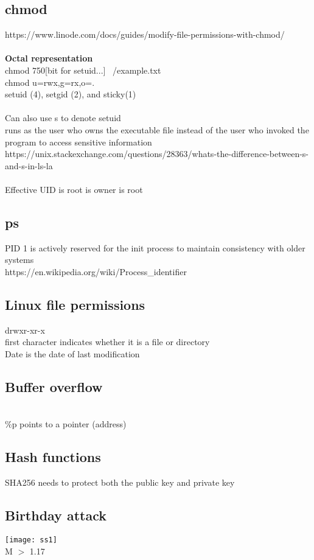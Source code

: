 \documentclass[11pt]{article}
\begin{document}
\begin{multicols*}{3}
\subsection*{chmod}
\textcolor{link}{https://www.linode.com/docs/guides/modify-file-permissions-with-chmod/}\\\\
\textbf{Octal representation}\\
chmod 750[bit for setuid...] ~/example.txt\\
chmod u=rwx,g=rx,o=.\\
setuid (4), setgid (2), and sticky(1)\\
\\
Can also use s to denote setuid\\
runs as the user who owns the executable file instead of the user who invoked the program to access sensitive information\\
\textcolor{link}{https://unix.stackexchange.com/questions/28363/whats-the-difference-between-s-and-s-in-ls-la}\\\\
Effective UID is root is owner is root
\subsection*{ps}
PID 1 is actively reserved for the init process to maintain consistency with older systems\\
\textcolor{link}{https://en.wikipedia.org/wiki/Process\_identifier}\\
\subsection*{Linux file permissions}
drwxr-xr-x\\
first character indicates whether it is a file or directory\\
Date is the date of last modification
\subsection*{Buffer overflow}\\
\%p points to a pointer (address)\\
\subsection*{Hash functions}
SHA256 needs to protect both the public key and private key
\subsection*{Birthday attack}
\texttt{[image: ss1]}
\\
M $>$ 1.17 

\end{multicols*}
\end{document}
